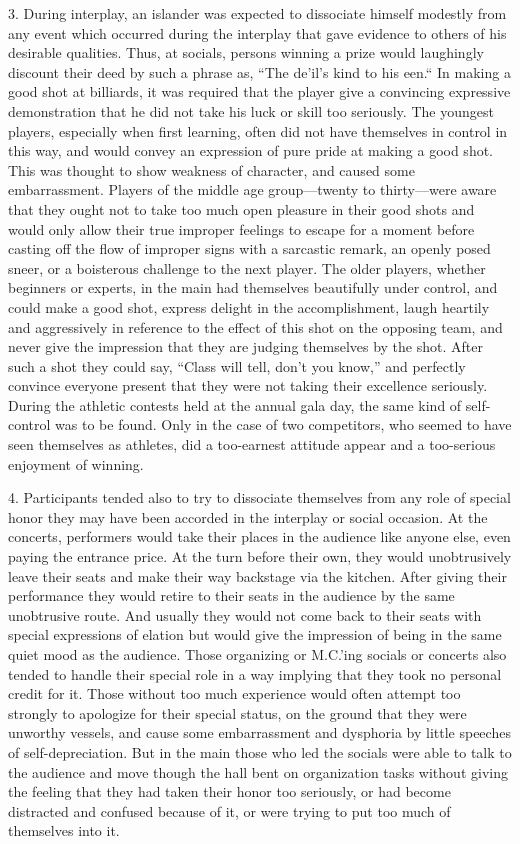 \documentclass[twoside,symmetric,nobib,justified]{tufte-book}
\begin{document}
3. During interplay, an islander was expected to dissociate himself
modestly from any event which occurred during the interplay that gave
evidence to others of his desirable qualities. Thus, at socials, persons
winning a prize would laughingly discount their deed by such a phrase
as, ``The de'il's kind to his een.`` In making a good shot at billiards,
it was required that the player give a convincing expressive
demonstration that he did not take his luck or skill too seriously. The
youngest players, especially when first learning, often did not have
themselves in control in this way, and would convey an expression of
pure pride at making a good shot. This was thought to show weakness of
character, and caused some embarrassment. Players of the middle age
group---twenty to thirty---were aware that they ought not to take too
much open pleasure in their good shots and would only allow their true
improper feelings to escape for a moment before casting off the flow of
improper signs with a sarcastic remark, an openly posed sneer, or a
boisterous challenge to the next player. The older players, whether
beginners or experts, in the main had themselves beautifully under
control, and could make a good shot, express delight in the
accomplishment, laugh heartily and aggressively in reference to the
effect of this shot on the opposing team, and never give the impression
that they are judging themselves by the shot. After such a shot they
could say, ``Class will tell, don't you know,'' and perfectly convince
everyone present that they were not taking their excellence seriously.
During the athletic contests held at the annual gala day, the same kind
of self-control was to be found. Only in the case of two competitors,
who seemed to have seen themselves as athletes, did a too-earnest
attitude appear and a too-serious enjoyment of winning.

4. Participants tended also to try to dissociate themselves from any
role of special honor they may have been accorded in the interplay or
social occasion. At the concerts, performers would take their places in
the audience like anyone else, even paying the entrance price. At the
turn before their own, they would unobtrusively leave their seats and
make their way backstage via the kitchen. After giving their performance
they would retire to their seats in the audience by the same unobtrusive
route. And usually they would not come back to their seats with special
expressions of elation but would give the impression of being in the
same quiet mood as the audience. Those organizing or M.C.'ing socials or
concerts also tended to handle their special role in a way implying that
they took no personal credit for it. Those without too much experience
would often attempt too strongly to apologize for their special status,
on the ground that they were unworthy vessels, and cause some
embarrassment and dysphoria by little speeches of self-depreciation. But
in the main those who led the socials were able to talk to the audience
and move though the hall bent on organization tasks without giving the
feeling that they had taken their honor too seriously, or had become
distracted and confused because of it, or were trying to put too much of
themselves into it.
\end{document}
